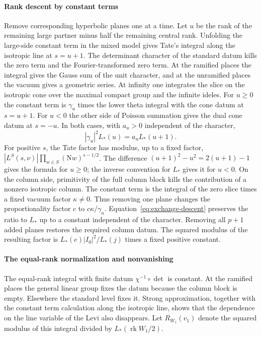 \paragraph{Rank descent by constant terms}
Remove corresponding hyperbolic planes one at a time. Let \(u\) be the rank
of the remaining large partner minus half the remaining central rank.
Unfolding the large-side constant term in the mixed model gives Tate's
integral along the isotropic line at \(s=u+1\). The determinant character of
the standard datum kills the zero term and the Fourier-transformed zero
term. At the ramified places the integral gives the Gauss sum of the unit
character, and at the unramified places the vacuum gives a geometric series.
At infinity one integrates the slice on the isotropic cone over the maximal
compact group and the infinite ideles. For \(u\ge0\) the constant term
is \(\gamma_u\) times the lower theta integral with the cone datum at \(s=u+1\).
For \(u<0\) the other side of Poisson summation gives the dual cone datum
at \(s=-u\). In both cases, with \(a_u>0\) independent of the character,
\begin{equation}\label{eq:exchange-descent}
 |\gamma_u|^2 L_*(u)=a_u L_*(u+1).
\end{equation}
For positive \(s\), the Tate factor has modulus, up to a fixed factor,
\(|L^S(s,\nu)|\prod_{w\in S}(\mathrm Nw)^{s-1/2}\).
The difference \((u+1)^2-u^2=2(u+1)-1\) gives the formula for \(u\ge0\);
the inverse convention for \(L_*\) gives it for \(u<0\).
On the column side, primitivity of the full column block kills the
contribution of a nonzero isotropic column. The constant term is the
integral of the zero slice times a fixed vacuum factor \(\kappa\ne0\).
Thus removing one plane changes the proportionality factor \(c\) to
\(c\kappa/\gamma_u\). Equation~\eqref{eq:exchange-descent} preserves the
ratio to \(L_*\) up to a constant independent of the character.
Removing all \(p+1\) added planes restores the required column datum.
The squared modulus of the resulting factor is \(L_*(e)|I_0|^2/L_*(j)\)
times a fixed positive constant.

\paragraph{The equal-rank normalization and nonvanishing}
The equal-rank integral with finite datum \(\chi^{-1}\circ\det\) is constant.
At the ramified places the general linear group fixes the datum because
the column block is empty. Elsewhere the standard level fixes it. Strong
approximation, together with the constant term calculation along the
isotropic line, shows that the dependence on the line variable of the
Levi also disappears. Let \(R_{W_1}(v_1)\) denote the squared modulus of this
integral divided by \(L_*(\operatorname{rk}W_1/2)\).

